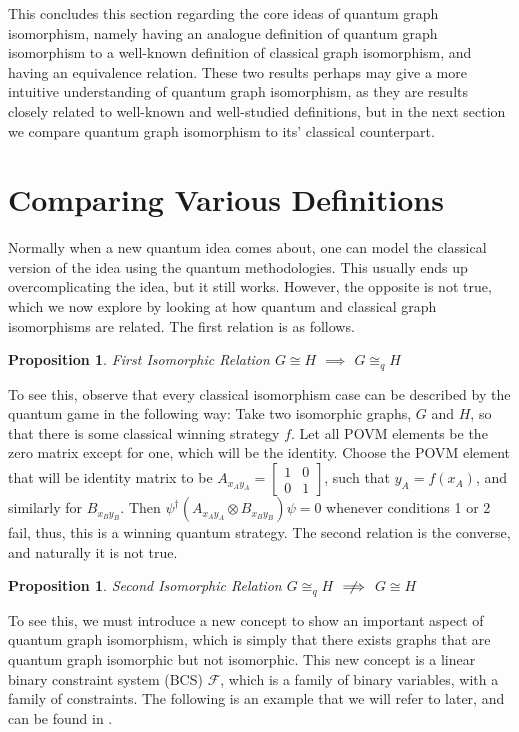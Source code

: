 \documentclass[12pt]{article}
\newtheorem{proposition}[thm]{Proposition}
\begin{document}
This concludes this section regarding the core ideas of quantum graph isomorphism, namely having an analogue definition of quantum graph isomorphism to a well-known definition of classical graph isomorphism, and having an equivalence relation. These two results perhaps may give a more intuitive understanding of quantum graph isomorphism, as they are results closely related to well-known and well-studied definitions, but in the next section we compare quantum graph isomorphism to its' classical counterpart.

\section{Comparing Various Definitions}
Normally when a new quantum idea comes about, one can model the classical version of the idea using the quantum methodologies. This usually ends up overcomplicating the idea, but it still works. However, the opposite is not true, which we now explore by looking at how quantum and classical graph isomorphisms are related. The first relation is as follows.

\begin{proposition}{First Isomorphic Relation}
\label{prop:isoimpliesqiso}
$G \cong H$ $\implies$ $G \cong_q H$
\end{proposition}
To see this, observe that every classical isomorphism case can be described by the quantum game in the following way: Take two isomorphic graphs, $G$ and $H$, so that there is some classical winning strategy $f$. Let all POVM elements be the zero matrix except for one, which will be the identity. Choose the POVM element that will be identity matrix to be $A_{x_Ay_A} = 
\begin{bmatrix}
1 & 0 \\
0 & 1
\end{bmatrix}$, such that $y_A = f(x_A)$, and similarly for $B_{x_By_B}$. Then $\psi^\dag(A_{x_Ay_A} \otimes B_{x_By_B})\psi = 0$ whenever conditions 1 or 2 fail, thus, this is a winning quantum strategy.
The second relation is the converse, and naturally it is not true.
\begin{proposition}{Second Isomorphic Relation}
$G \cong_q H$ $\centernot\implies$ $G \cong H$
\end{proposition}

To see this, we must introduce a new concept to show an important aspect of quantum graph isomorphism, which is simply  that there exists graphs that are quantum graph isomorphic but not isomorphic. This new concept is a linear binary constraint system (BCS) $\mathcal{F}$, which is a family of binary variables, with a family of constraints. The following is an example that we will refer to later, and can be found in \cite{Binary}.
\end{document}
